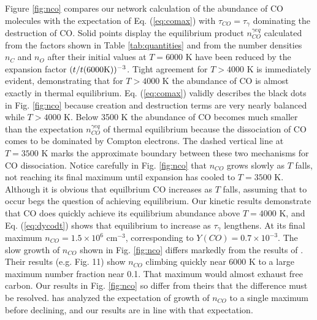 \documentclass[manuscript]{aastex}
\newcommand{\ncogeq}{n_{CO}^{\gamma eq}}
\begin{document}
Figure \ref{fig:nco}
compares our network calculation of the abundance of CO molecules
with the expectation of Eq. (\ref{eq:comax}) with $\tau_{CO} = \tau_\gamma$
dominating the destruction of CO.
Solid points display the equilibrium product $\ncogeq$ calculated from the
factors shown in Table \ref{tab:quantities}
and from the number densities $n_C$ and $n_O$ after
their initial values at $T=6000$ K have been reduced by the expansion factor
$(t/t(6000 {\rm K}))^{-3}$.
Tight agreement for $T > 4000$ K is immediately evident,
demonstrating that for $T > 4000$ K the abundance of CO is almost exactly in
thermal equilibrium. Eq. (\ref{eq:comax}) validly describes the black dots in
Fig. \ref{fig:nco} because creation and destruction terms are very nearly
balanced while $T > 4000$ K.
Below 3500 K the abundance of CO becomes much smaller than
the expectation $\ncogeq$ of thermal equilibrium because the dissociation of CO
comes to be dominated by Compton electrons. The dashed vertical line at
$T=3500$ K marks the approximate boundary between these two mechanisms for CO
dissociation. Notice carefully in Fig. \ref{fig:nco}
that $n_{CO}$ grows slowly as $T$ falls, not reaching
its final maximum until expansion has cooled to $T=3500$ K.
Although it is obvious that equilbrium CO increases as $T$ falls,
assuming that to occur begs the question of achieving equilibrium.
Our kinetic results demonstrate that CO does quickly achieve its
equilibrium abundance above $T = 4000$ K, and Eq. (\ref{eq:dycodt})
shows that equilibrium to increase as $\tau_\gamma$ lengthens.
At its final maximum $n_{CO} = 1.5 \times 10^6$ cm$^{-3}$,
corresponding to $Y(CO) = 0.7 \times 10^{-3}$. The slow growth of $n_{CO}$
shown in Fig. \ref{fig:nco} differs markedly from the results of
\citet{2009ApJ...703..642C}.
Their results (e.g. Fig. 11) show $n_{CO}$ climbing quickly near 6000 K
to a large
maximum number fraction near 0.1. That maximum would almost exhaust free
carbon. Our results in Fig. \ref{fig:nco}
so differ from theirs that the difference
must be resolved. \citet{2013ApJ...762....5C} has analyzed the expectation
of growth of $n_{CO}$ to a single maximum before declining, and our results are
in line with that expectation. 
\end{document}
